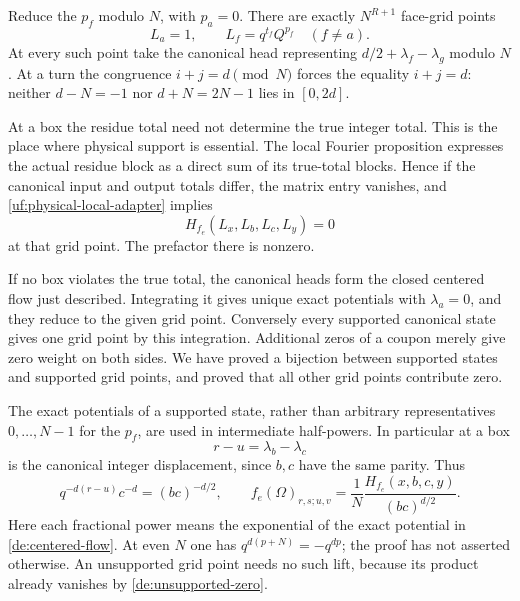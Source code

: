 Reduce the \(p_f\) modulo \(N\), with \(p_a=0\). There are exactly
\(N^{R+1}\) face-grid points
\begin{equation}\label{de:face-grid}
 L_a=1,\qquad L_f=q^{t_f}Q^{p_f}\quad(f\ne a).
\end{equation}
At every such point take the canonical head representing
\(d/2+\lambda_f-\lambda_g\) modulo \(N\). At a turn the
congruence \(i+j=d\pmod N\) forces the equality \(i+j=d\):
neither \(d-N=-1\) nor \(d+N=2N-1\) lies in \([0,2d]\).

At a box the residue total need not determine the true integer
total. This is the place where physical support is essential.
The local Fourier proposition expresses the actual residue
block as a direct sum of its true-total blocks. Hence if the
canonical input and output totals differ, the matrix entry
vanishes, and \eqref{uf:physical-local-adapter} implies
\begin{equation}\label{de:unsupported-zero}
                    H_{f_e}(L_x,L_b,L_c,L_y)=0
\end{equation}
at that grid point. The prefactor there is nonzero.

If no box violates the true total, the canonical heads form the
closed centered flow just described. Integrating it gives unique
exact potentials with \(\lambda_a=0\), and they reduce to the
given grid point. Conversely every supported canonical state
gives one grid point by this integration. Additional zeros of
a coupon merely give zero weight on both sides. We have proved
a bijection between supported states and supported grid points,
and proved that all other grid points contribute zero.

The exact potentials of a supported state, rather than arbitrary
representatives \(0,\ldots,N-1\) for the \(p_f\), are used in
intermediate half-powers. In particular at a box
\[
                 r-u=\lambda_b-\lambda_c
\]
is the canonical integer displacement, since \(b,c\) have the
same parity. Thus
\begin{equation}\label{de:coherent-adapter}
 q^{-d(r-u)}c^{-d}=(bc)^{-d/2},\qquad
 f_e(\Omega)_{r,s;u,v}
        =\frac1N\frac{H_{f_e}(x,b,c,y)}{(bc)^{d/2}}.
\end{equation}
Here each fractional power means the exponential of the exact
potential in \eqref{de:centered-flow}. At even \(N\) one has
\(q^{d(p+N)}=-q^{dp}\); the proof has not asserted otherwise.
An unsupported grid point needs no such lift, because its
product already vanishes by \eqref{de:unsupported-zero}.

